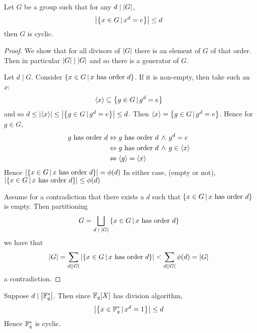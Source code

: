 \begin{prop}
    Let $G$ be a group such that for any $d \mid \left\vert G \right\vert$,
    \[\left\vert \left\{x \in G \,|\, x^d = e\right\} \right\vert \le d \]
    then $G$ is cyclic.
\end{prop}
\begin{proof}
    We show that for all divisors of $\left\vert G \right\vert$ there is an element
    of $G$ of that order. 
    Then in particular $\left\vert G \right\vert \mid \left\vert G \right\vert$ 
    and so there is a generator of $G$.

    Let $d \mid G$. 
    Consider $\left\{x \in G \,|\, x \text{ has order } d\right\}$.
    If it is non-empty, then take such an $x$:
    \[
        \langle x\rangle \subseteq
        \left\{g \in G \,|\, g^d = e\right\}
    \]
    and so $d \le \left\vert \langle x\rangle \right\vert \le \left\vert \left\{g \in G \,|\, g^d = e\right\} \right\vert \le d$.
    Then $\langle x\rangle = \left\{g \in G \,|\, g^d = e\right\}$.
    Hence for $g \in G$,
    \begin{align*}
        g \text{ has order } d &\Leftrightarrow
         g \text{ has order } d \, \land \, g^d = e\\
         &\Leftrightarrow g \text{ has order } d \, \land \, g \in \langle x\rangle\\
         &\Leftrightarrow \langle g\rangle = \langle x\rangle
    \end{align*}
    Hence $\left\vert \left\{x \in G \,|\, x \text{ has order } d\right\} \right\vert = \phi(d)$
    In either case, (empty or not), 
    $\left\vert \left\{x \in G \,|\, x \text{ has order } d\right\} \right\vert \le \phi(d)$
    
    Assume for a contradiction that there exists a $d$ such that 
    $\left\{x \in G \,|\, x \text{ has order } d\right\}$
    is empty.
    Then partitioning 
    \[G = \bigsqcup_{d \;\mid \;\left\vert G \right\vert} \left\{x \in G \,|\, x \text{ has order } d\right\}\]
    we have that 
    \[
        \left\vert G \right\vert = \sum_{d \mid \left\vert G \right\vert} 
            \left\vert \left\{x \in G \,|\, x \text{ has order } d\right\} \right\vert
            < \sum_{d \mid \left\vert G \right\vert} \phi(d) 
            = \left\vert G \right\vert
    \]
    a contradiction.
\end{proof}

\begin{prop}[$\F_q^*$ is cyclic]
    Suppose $d \mid \left\vert \mathbb{F}_q^* \right\vert$.
    Then since $\mathbb{F}_q[X]$ has division algorithm,
    \[\left\vert \left\{x \in \mathbb{F}_q^* \,|\, x^d = 1\right\} \right\vert \le d \]
    Hence $\F_q^*$ is cyclic.
\end{prop}

